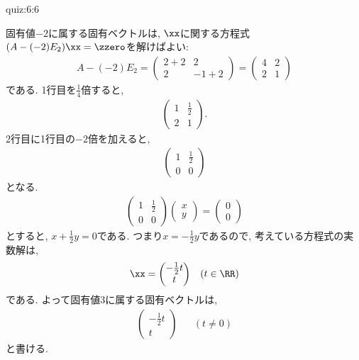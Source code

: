 \begin{answerof}{quiz:6:6}
  
  固有値$-2$に属する固有ベクトルは,
  $\xx$に関する方程式$(A-(-2)E_2)\xx=\zzero$を解けばよい:
  \begin{align*}
    A-(-2)E_2=
    \begin{pmatrix}
      2+2&2\\2&-1+2
    \end{pmatrix}
    =
    \begin{pmatrix}
      4&2\\2&1
    \end{pmatrix}
  \end{align*}
  である.  1行目を$\frac{1}{4}$倍すると,
  \begin{align*}
    \begin{pmatrix}
      1&\frac{1}{2}\\2&1
    \end{pmatrix}.
  \end{align*}
  2行目に1行目の$-2$倍を加えると,
  \begin{align*}
    \begin{pmatrix}
      1&\frac{1}{2}\\0&0
    \end{pmatrix}
  \end{align*}
  となる.
  \begin{align*}
    \begin{pmatrix}
      1&\frac{1}{2}\\0&0
    \end{pmatrix}
    \begin{pmatrix}
      x\\y
    \end{pmatrix}=
    \begin{pmatrix}
      0\\0
    \end{pmatrix}
  \end{align*}
  とすると, $x+\frac{1}{2}y=0$である.
  つまり$x=-\frac{1}{2}y$であるので, 考えている方程式の実数解は,
  \begin{align*}
    \xx=
    \begin{pmatrix}
      -\frac{1}{2}t\\t
    \end{pmatrix}&&(t\in\RR)
  \end{align*}
  である.
  よって固有値$3$に属する固有ベクトルは,
  \begin{align*}
    \begin{pmatrix}
      -\frac{1}{2}t\\t
    \end{pmatrix}&&(t\neq 0)
  \end{align*}
  と書ける.


\end{answerof}
